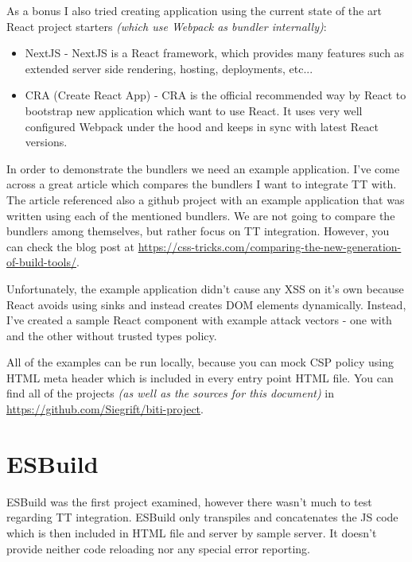 As a bonus I also tried creating application using the current state of the art React project
starters \emph{(which use Webpack as bundler internally)}:

\begin{itemize}
  \item  NextJS \cite{nextjs_web} - NextJS is a React framework, which provides many features such
        as extended server side rendering, hosting, deployments, etc...
  \item  CRA (Create React App) \cite{cra_web} - CRA is the official recommended way by React to
        bootstrap new application which want to use React. It uses very well configured Webpack
        under the hood and keeps in sync with latest React versions.
\end{itemize}

\bigskip

In order to demonstrate the bundlers we need an example application. I've come across a great
article which compares the bundlers I want to integrate TT with. The article referenced also a
github project with an example application that was written using each of the mentioned bundlers. We
are not going to compare the bundlers among themselves, but rather focus on TT integration. However,
you can check the blog post at
\url{https://css-tricks.com/comparing-the-new-generation-of-build-tools/}.

Unfortunately, the example application didn't cause any XSS on it's own because React avoids using
sinks and instead creates DOM elements dynamically. Instead, I've created a sample React component
with example attack vectors - one with and the other without trusted types policy.

All of the examples can be run locally, because you can mock CSP policy using HTML meta header which
is included in every entry point HTML file. You can find all of the projects \emph{(as well as the
  sources for this document)} in \url{https://github.com/Siegrift/biti-project}.

\section{ESBuild}

ESBuild was the first project examined, however there wasn't much to test regarding TT integration.
ESBuild only transpiles and concatenates the JS code which is then included in HTML file and server
by sample server. It doesn't provide neither code reloading nor any special error reporting.

